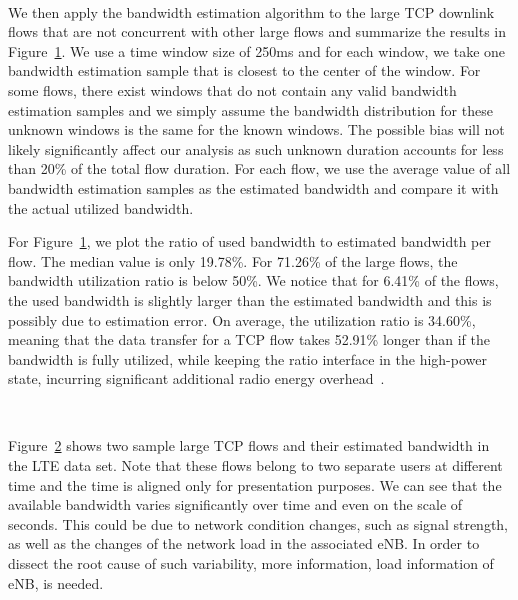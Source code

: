 \begin{figure}[t]
\centering
{}\\
\label{fig:bwe}
\end{figure}

We then apply the bandwidth estimation algorithm to the large TCP downlink flows that are not concurrent with other large flows and summarize the results in Figure~\ref{fig:bwe}. We use a time window size of 250ms and for each window, we take one bandwidth estimation sample that is closest to the center of the window. For some flows, there exist windows that do not contain any valid bandwidth estimation samples and we simply assume the bandwidth distribution for these unknown windows is the same for the known windows. The possible bias will not likely significantly affect our analysis as such unknown duration accounts for less than 20\% of the total flow duration. For each flow, we use the average value of all bandwidth estimation samples as the estimated bandwidth and compare it with the actual utilized bandwidth.

For Figure~\ref{fig:bwe}, we plot the ratio of used bandwidth to estimated bandwidth per flow. The median value is only 19.78\%. For 71.26\% of the large flows, the bandwidth utilization ratio is below 50\%. We notice that for 6.41\% of the flows, the used bandwidth is slightly larger than the estimated bandwidth and this is possibly due to estimation error. On average, the utilization ratio is 34.60\%, meaning that the data transfer for a TCP flow takes 52.91\% longer than if the bandwidth is fully utilized, while keeping the ratio interface in the high-power state, incurring significant additional radio energy overhead~\cite{huang_mobisys12}.


\begin{figure}[t]
\centering
{}\\
\label{fig:bwe.sample}
\end{figure}

Figure~\ref{fig:bwe.sample} shows two sample large TCP flows and their estimated bandwidth in the LTE data set. Note that these flows belong to two separate users at different time and the time is aligned only for presentation purposes. We can see that the available bandwidth varies significantly over time and even on the scale of seconds. This could be due to network condition changes, such as signal strength, as well as the changes of the network load in the associated eNB. In order to dissect the root cause of such variability, more information, \eg load information of eNB, is needed.

